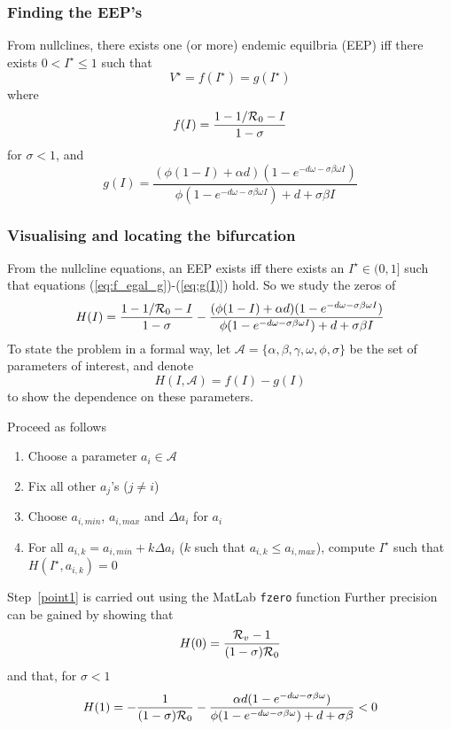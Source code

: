 \documentclass[aspectratio=169]{beamer}\usepackage[]{graphicx}\usepackage[]{xcolor}
\begin{document}
\begin{frame}\frametitle{Finding the EEP's}
From nullclines, there exists one (or more) endemic equilbria
(EEP) iff there exists $0<I^\star\leq 1$ such that
\begin{equation}
 V^\star=f(I^\star)=g(I^\star)
 \label{eq:f_egal_g}
\end{equation}
where
\begin{equation}
 f(I)=\frac{1-1/\mathcal{R}_0-I}{1-\sigma}
 \label{eq:f(I)}
\end{equation}
for $\sigma<1$, and
\begin{equation}
 g(I)=\frac{(\phi(1-I)+\alpha d)(1-e^{-d\omega-\sigma\beta\omega I})}
 {\phi(1-e^{-d\omega-\sigma\beta\omega I})+d+\sigma\beta I}
 \label{eq:g(I)}
\end{equation}
\end{frame}


\begin{frame}
\frametitle{Visualising and locating the bifurcation}
From the nullcline equations, an EEP exists iff there exists an
$I^\star\in(0,1]$ such that equations (\ref{eq:f_egal_g})-(\ref{eq:g(I)})
hold.
So we study the zeros of
\[
H(I)=\frac{1-1/\mathcal{R}_0-I}{1-\sigma} -
\frac{(\phi(1-I)+\alpha d)(1-e^{-d\omega-\sigma\beta\omega I})}
{\phi(1-e^{-d\omega-\sigma\beta\omega I})+d+\sigma\beta I}
\]
To state the problem in a formal way, let
$\mathcal{A}=\{\alpha,\beta,\gamma,\omega,\phi,\sigma\}$ be the set of
parameters of interest, and denote
\begin{equation}
H(I,\mathcal{A})=
f(I)-g(I)
\label{eq:H}
\end{equation}
to show the dependence on these parameters.
\end{frame}

\begin{frame}
Proceed as follows
\begin{enumerate}
\item Choose a parameter $a_i\in\mathcal{A}$
\item Fix all other $a_j$'s ($j\neq i$)
\item Choose $a_{i,min}$, $a_{i,max}$ and $\Delta a_i$ for $a_i$
\item For all
  $a_{i,k}=a_{i,min}+k\Delta a_i$ ($k$
  such that $a_{i,k}\leq a_{i,max}$), compute
  $I^\star$ such that $H(I^\star,a_{i,k})=0$ \label{point1}
\end{enumerate}
Step~\ref{point1} is carried out using the {\sc MatLab} {\tt fzero} function
\vfill
Further precision can be gained by showing that
\[
H(0)=\frac{\mathcal{R}_v-1}{(1-\sigma)\mathcal{R}_0}
\]
and that, for $\sigma<1$
\[
H(1)=-\frac{1}{(1-\sigma)\mathcal{R}_0}-\frac{\alpha
d(1-e^{-d\omega-\sigma\beta\omega})}{\phi(1
-e^{-d\omega-\sigma\beta\omega})+d+\sigma\beta}<0
\]
\end{frame}
\end{document}
